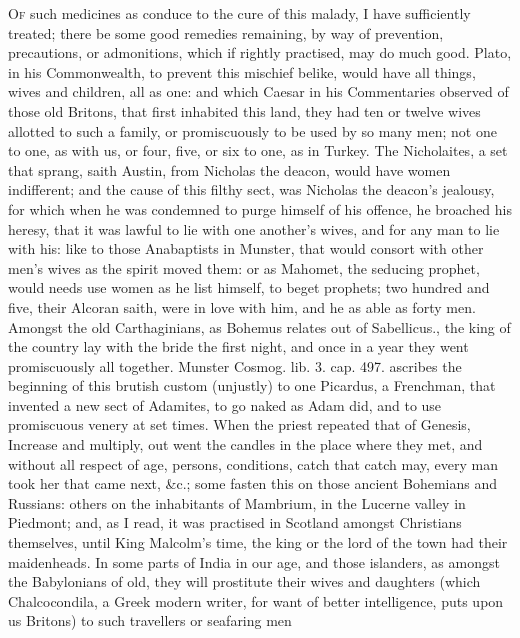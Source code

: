 {\lettrine{O}{f} such medicines as conduce to the cure of this malady, I have
sufficiently treated; there be some good remedies remaining, by way of
prevention, precautions, or admonitions, which if rightly practised,
may do much good. Plato, in his Commonwealth, to prevent this mischief
belike, would have all things, wives and children, all as one: and
which Caesar in his Commentaries observed of those old Britons, that
first inhabited this land, they had ten or twelve wives allotted to
such a family, or promiscuously to be used by so many men; not one to
one, as with us, or four, five, or six to one, as in Turkey. The
Nicholaites, a set that sprang, saith Austin, from Nicholas the
deacon, would have women indifferent; and the cause of this filthy
sect, was Nicholas the deacon's jealousy, for which when he was
condemned to purge himself of his offence, he broached his heresy, that
it was lawful to lie with one another's wives, and for any man to lie
with his: like to those Anabaptists in Munster, that would
consort with other men's wives as the spirit moved them: or as
Mahomet, the seducing prophet, would needs use women as he list
himself, to beget prophets; two hundred and five, their Alcoran saith,
were in love with him, and he as able as forty men. Amongst the
old Carthaginians, as Bohemus relates out of Sabellicus., the
king of the country lay with the bride the first night, and once in a
year they went promiscuously all together. Munster Cosmog. lib. 3. cap.
497. ascribes the beginning of this brutish custom (unjustly) to one
Picardus, a Frenchman, that invented a new sect of Adamites, to go
naked as Adam did, and to use promiscuous venery at set times. When the
priest repeated that of Genesis, Increase and multiply, out went
the candles in the place where they met, and without all respect of
age, persons, conditions, catch that catch may, every man took her that
came next, \&c.; some fasten this on those ancient Bohemians and
Russians: others on the inhabitants of Mambrium, in the Lucerne
valley in Piedmont; and, as I read, it was practised in Scotland
amongst Christians themselves, until King Malcolm's time, the king or
the lord of the town had their maidenheads. In some parts of
India in our age, and those islanders, as amongst the
Babylonians of old, they will prostitute their wives and daughters
(which Chalcocondila, a Greek modern writer, for want of better
intelligence, puts upon us Britons) to such travellers or seafaring men
}
